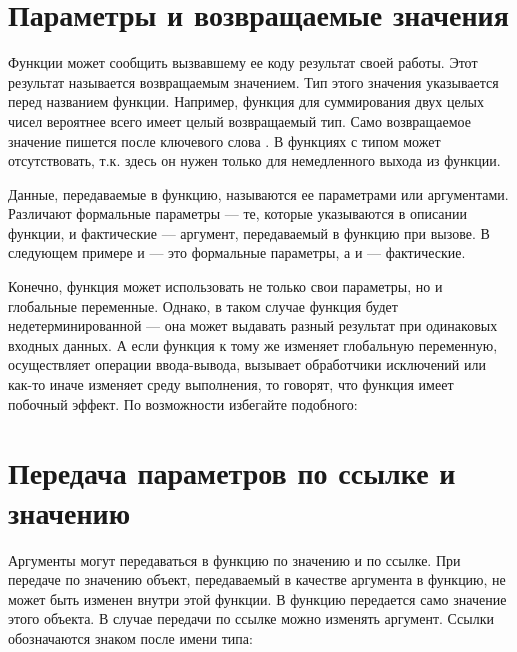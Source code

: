 \documentclass[book.tex]{subfiles}
\begin{document}
\section*{Параметры и возвращаемые значения}

Функции может сообщить вызвавшему ее коду результат своей работы. Этот результат называется возвращаемым значением. Тип этого значения указывается перед названием функции. Например, функция для суммирования двух целых чисел вероятнее всего имеет целый возвращаемый тип. Само возвращаемое значение пишется после ключевого слова . В функциях с типом   может отсутствовать, т.к. здесь он нужен только для немедленного выхода из функции.

Данные, передаваемые в функцию, называются ее параметрами или аргументами. Различают формальные параметры --- те, которые указываются в описании функции, и фактические --- аргумент, передаваемый в функцию при вызове. В следующем примере  и  --- это формальные параметры, а  и  --- фактические.


Конечно, функция может использовать не только свои параметры, но и глобальные переменные. Однако, в таком случае функция будет недетерминированной --- она может выдавать разный результат при одинаковых входных данных. А если функция к тому же изменяет глобальную переменную, осуществляет операции ввода-вывода, вызывает обработчики исключений или как-то иначе изменяет среду выполнения, то говорят, что функция имеет побочный эффект. По возможности избегайте подобного:


\section*{Передача параметров по ссылке и значению}

Аргументы могут передаваться в функцию по значению и по ссылке. При передаче по значению объект, передаваемый в качестве аргумента в функцию, не может быть изменен внутри этой функции. В функцию передается само значение этого объекта. В случае передачи по ссылке можно изменять аргумент. Ссылки обозначаются знаком \cppword{\&} после имени типа:

\end{document}
